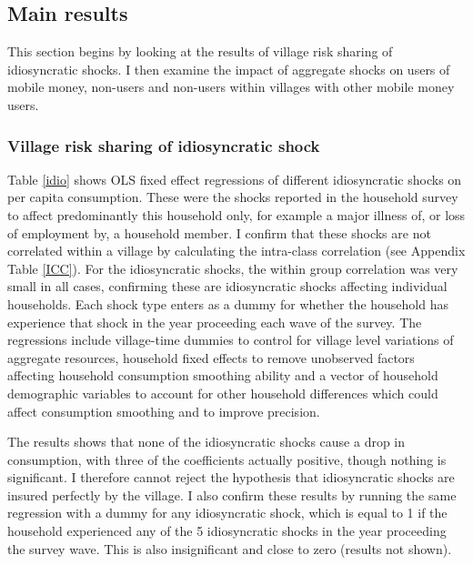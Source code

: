 \subsection{Main results}
This section begins by looking at the results of village risk sharing of idiosyncratic shocks. I then examine the impact of aggregate shocks on users of mobile money, non-users and non-users within villages with other mobile money users.  

\subsubsection{Village risk sharing of idiosyncratic shock}
Table \ref{idio} shows OLS fixed effect regressions of different idiosyncratic shocks on per capita consumption. These were the shocks reported in the household survey to affect predominantly this household only, for example a major illness of, or loss of employment by, a household member. I confirm that these shocks are not correlated within a village by calculating the intra-class correlation (see Appendix Table \ref{ICC}). For the idiosyncratic shocks, the within group correlation was very small in all cases, confirming these are idiosyncratic shocks affecting individual households.     
Each shock type enters as a dummy for whether the household has experience that shock in the year proceeding each wave of the survey. The regressions include village-time dummies to control for village level variations of aggregate resources, household fixed effects to remove unobserved factors affecting household consumption smoothing ability and a vector of household demographic variables to account for other household differences which could affect consumption smoothing and to improve precision. 

The results shows that none of the idiosyncratic shocks cause a drop in consumption, with three of the coefficients actually positive, though nothing is significant. I therefore cannot reject the hypothesis that idiosyncratic shocks are insured perfectly by the village. I also confirm these results by running the same regression with a dummy for any idiosyncratic shock, which is equal to 1 if the household experienced any of the 5 idiosyncratic shocks in the year proceeding the survey wave. This is also insignificant and close to zero (results not shown).  



